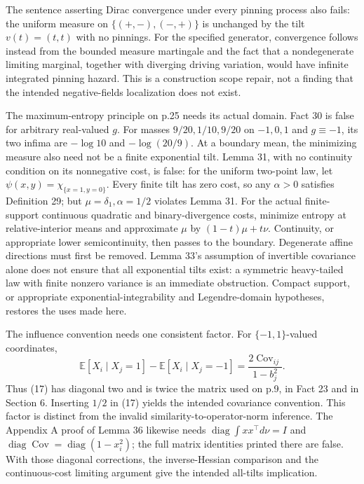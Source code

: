\documentclass[10pt]{article}
\begin{document}
The sentence asserting Dirac convergence under every pinning process also fails: the uniform measure on \(\{(+,-),(-,+)\}\) is unchanged by the tilt \(v(t)=(t,t)\) with no pinnings. For the specified generator, convergence follows instead from the bounded measure martingale and the fact that a nondegenerate limiting marginal, together with diverging driving variation, would have infinite integrated pinning hazard. This is a construction scope repair, not a finding that the intended negative-fields localization does not exist.\par
The maximum-entropy principle on p.25 needs its actual domain. Fact 30 is false for arbitrary real-valued \(g\). For masses \(9/20,1/10,9/20\) on \(-1,0,1\) and \(g\equiv-1\), its two infima are \(-\log10\) and \(-\log(20/9)\). At a boundary mean, the minimizing measure also need not be a finite exponential tilt. Lemma 31, with no continuity condition on its nonnegative cost, is false: for the uniform two-point law, let \(\psi(x,y)=\chi_{\{x=1,y=0\}}\). Every finite tilt has zero cost, so any \(\alpha>0\) satisfies Definition 29; but \(\mu=\delta_1,\alpha=1/2\) violates Lemma 31. For the actual finite-support continuous quadratic and binary-divergence costs, minimize entropy at relative-interior means and approximate \(\mu\) by \((1-t)\mu+t\nu\). Continuity, or appropriate lower semicontinuity, then passes to the boundary. Degenerate affine directions must first be removed. Lemma 33’s assumption of invertible covariance alone does not ensure that all exponential tilts exist: a symmetric heavy-tailed law with finite nonzero variance is an immediate obstruction. Compact support, or appropriate exponential-integrability and Legendre-domain hypotheses, restores the uses made here.\par
The influence convention needs one consistent factor. For \(\{-1,1\}\)-valued coordinates, \[\mathbb E[X_i\mid X_j=1]-\mathbb E[X_i\mid X_j=-1]
      =\frac{2\operatorname{Cov}_{ij}}{1-b_j^2}.\] Thus (17) has diagonal two and is twice the matrix used on p.9, in Fact 23 and in Section 6. Inserting \(1/2\) in (17) yields the intended covariance convention. This factor is distinct from the invalid similarity-to-operator-norm inference. The Appendix A proof of Lemma 36 likewise needs \(\operatorname{diag}\int xx^{\top}d\nu=I\) and \(\operatorname{diag}\operatorname{Cov}=\operatorname{diag}(1-x_i^2)\); the full matrix identities printed there are false. With those diagonal corrections, the inverse-Hessian comparison and the continuous-cost limiting argument give the intended all-tilts implication.\par
\end{document}
